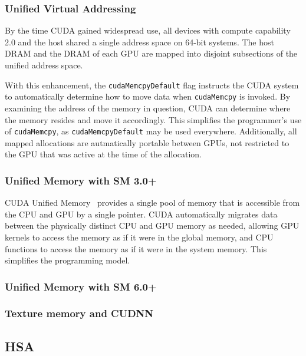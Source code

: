 \subsubsection{Unified Virtual Addressing}

By the time CUDA gained widespread use, all devices with compute capability 2.0 and the host shared a single address space on 64-bit systems.
The host DRAM and the DRAM of each GPU are mapped into disjoint subsections of the unified address space.

With this enhancement, the \texttt{cudaMemcpyDefault} flag instructs the CUDA system to automatically determine how to move data when \texttt{cudaMemcpy} is invoked.
By examining the address of the memory in question, CUDA can determine where the memory resides and move it accordingly.
This simplifies the programmer's use of \texttt{cudaMemcpy}, as \texttt{cudaMemcpyDefault} may be used everywhere.
Additionally, all mapped allocations are autmatically portable between GPUs, not restricted to the GPU that was active at the time of the allocation.

\subsubsection{Unified Memory with SM 3.0+}

CUDA Unified Memory~\cite{harris2013cudaunifiedmemory} provides a single pool of memory that is accessible from the CPU and GPU by a single pointer.
CUDA automatically migrates data between the physically distinct CPU and GPU memory as needed, allowing GPU kernels to access the memory as if it were in the global memory, and CPU functions to access the memory as if it were in the system memory.
This simplifies the programming model.

\subsubsection{Unified Memory with SM 6.0+}




\subsubsection{Texture memory and CUDNN}

\subsection{HSA}
\label{sec:hsa}


